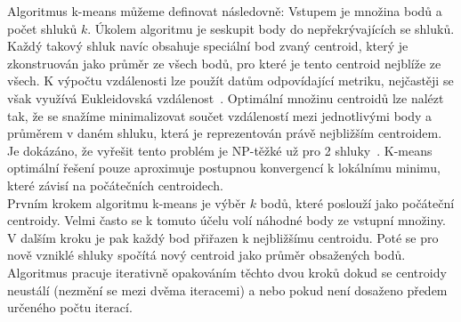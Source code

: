 Algoritmus k-means můžeme definovat následovně: Vstupem je množina bodů a počet shluků $k$. Úkolem algoritmu je seskupit body do nepřekrývajících se shluků. Každý takový shluk navíc obsahuje speciální bod zvaný centroid, který je zkonstruován jako průměr ze všech bodů, pro které je tento centroid nejblíže ze všech. K výpočtu vzdálenosti lze použít datům odpovídající metriku, nejčastěji se však využívá Eukleidovská vzdálenost~\cite{Zechner09}. Optimální množinu centroidů lze nalézt tak, že se snažíme minimalizovat součet vzdáleností mezi jednotlivými body a průměrem v daném shluku, která je reprezentován právě nejbližším centroidem. Je dokázáno, že vyřešit tento problém je NP-těžké už pro 2 shluky~\cite{Drineas04}. K-means optimální řešení pouze aproximuje postupnou konvergencí k lokálnímu minimu, které závisí na počátečních centroidech.\\


Prvním krokem algoritmu k-means je výběr $k$ bodů, které poslouží jako počáteční centroidy. Velmi často se k tomuto účelu volí náhodné body ze vstupní množiny. V dalším kroku je pak každý bod přiřazen k nejbližšímu centroidu. Poté se pro nově vzniklé shluky spočítá nový centroid jako průměr obsažených bodů. Algoritmus pracuje iterativně opakováním těchto dvou kroků dokud se centroidy neustálí (nezmění se mezi dvěma iteracemi) a nebo pokud není dosaženo předem určeného počtu iterací.\\


